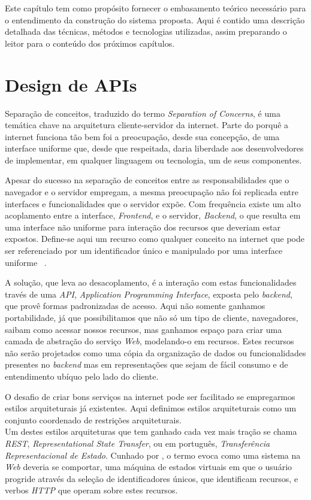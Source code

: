 Este capítulo tem como propósito fornecer o embasamento teórico necessário 
para o entendimento da construção do sistema proposta. Aqui é contido uma
descrição detalhada das técnicas, métodos e tecnologias utilizadas, assim  
preparando o leitor para o conteúdo dos próximos capítulos.


\section{Design de APIs}
Separação de conceitos, traduzido do termo \emph{Separation of Concerns}, é uma temática 
chave na arquitetura cliente-servidor da internet. Parte do porquê a internet funciona tão bem
foi a preocupação, desde sua concepção, de uma interface uniforme que, desde que respeitada, 
 daria liberdade aos desenvolvedores de implementar, em qualquer linguagem ou tecnologia,
 um de seus componentes. 

Apesar do sucesso na separação de conceitos entre as responsabilidades que o navegador 
e o servidor empregam, a mesma preocupação não foi replicada entre interfaces e 
funcionalidades que o servidor expõe. 
Com frequência existe um alto acoplamento entre a interface, \emph{Frontend},
e o servidor, \emph{Backend}, o que resulta em uma interface não uniforme para interação 
dos recursos que deveriam estar expostos. Define-se aqui um recurso como qualquer conceito 
na internet que pode ser referenciado por um identificador único e manipulado por uma interface uniforme 
\ \cite{masse2011rest}.

A solução, que leva ao desacoplamento, é a interação com estas
funcionalidades través de uma \emph{API}, \emph{Application Programming Interface},
exposta pelo \emph{backend}, que provê formas padronizadas 
de acesso. Aqui não somente ganhamos portabilidade, já que possibilitamos que não só 
um tipo de cliente, navegadores, saibam como acessar nossos recursos, mas ganhamos espaço 
para criar uma camada de abstração do serviço \emph{Web}, modelando-o em recursos.
Estes recursos não serão projetados como uma cópia da organização de dados ou funcionalidades 
presentes no \emph{backend} mas em representações que sejam de fácil consumo e de entendimento 
ubíquo pelo lado do cliente.

O desafio de criar bons serviços na internet pode ser facilitado se empregarmos estilos 
arquiteturais já existentes. Aqui definimos estilos arquiteturais como 
um conjunto coordenado de restrições arquiteturais. \\
Um destes estilos arquiteturas que tem ganhado cada vez 
mais tração se chama \emph{REST}, \emph{Representational State Transfer}, ou em português,
\emph{Transferência Representacional de Estado}. Cunhado por , 
o termo evoca como uma sistema na \emph{Web} deveria se comportar, uma máquina de estados 
virtuais em que o usuário progride através da seleção de identificadores únicos, que identificam 
recursos, e verbos \emph{HTTP}
que operam sobre estes recursos.

